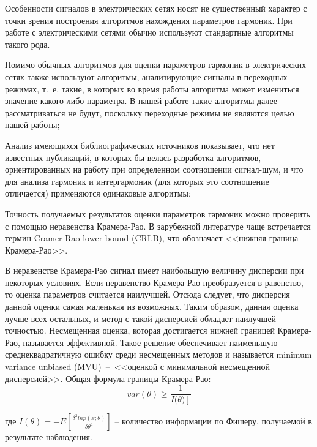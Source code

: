 Особенности сигналов в электрических сетях носят не существенный характер с точки зрения построения алгоритмов нахождения параметров гармоник. При работе с электрическими сетями обычно используют стандартные алгоритмы такого рода. 

Помимо обычных алгоритмов для оценки параметров гармоник в электрических сетях также используют алгоритмы, анализирующие сигналы в переходных режимах, т.~е. такие, в которых во время работы алгоритма может измениться значение какого-либо параметра. В нашей работе такие алгоритмы далее рассматриваться не будут, поскольку переходные режимы не являются целью нашей работы;

Анализ имеющихся библиографических источников показывает, что нет известных публикаций, в которых бы велась разработка алгоритмов, ориентированных на работу при определенном соотношении сигнал-шум, и что для анализа гармоник и интергармоник (для которых это соотношение отличается) применяются одинаковые алгоритмы; 

Точность получаемых результатов оценки параметров гармоник можно проверить с помощью неравенства Крамера-Рао. В зарубежной литературе чаще встречается термин Cramer-Rao lower bound (CRLB), что обозначает <<нижняя граница Крамера-Рао>>. 

В неравенстве Крамера-Рао сигнал имеет наибольшую величину дисперсии при некоторых условиях. Если неравенство Крамера-Рао преобразуется в равенство, то оценка параметров считается наилучшей. Отсюда следует, что дисперсия данной оценки самая маленькая из возможных. Таким образом, данная оценка лучше всех остальных, и метод с такой дисперсией обладает наилучшей точностью. Несмещенная оценка, которая достигается нижней границей Крамера-Рао, называется эффективной. Такое решение обеспечивает наименьшую среднеквадратичную ошибку среди несмещенных методов и называется minimum variance unbiased (MVU)~--~<<оценкой с минимальной несмещенной дисперсией>>. Общая формула границы Крамера-Рао:
\begin{equation}
	\label{eq:equation2}
	var(\theta)\geq\frac{1}{I(\left.\theta)\right]}
\end{equation}

где $I(\theta)=-E\left[\frac{\delta^2 ln p(x;\theta)}{\delta\theta^2}\right]$ -- количество информации по Фишеру, получаемой в результате наблюдения.

